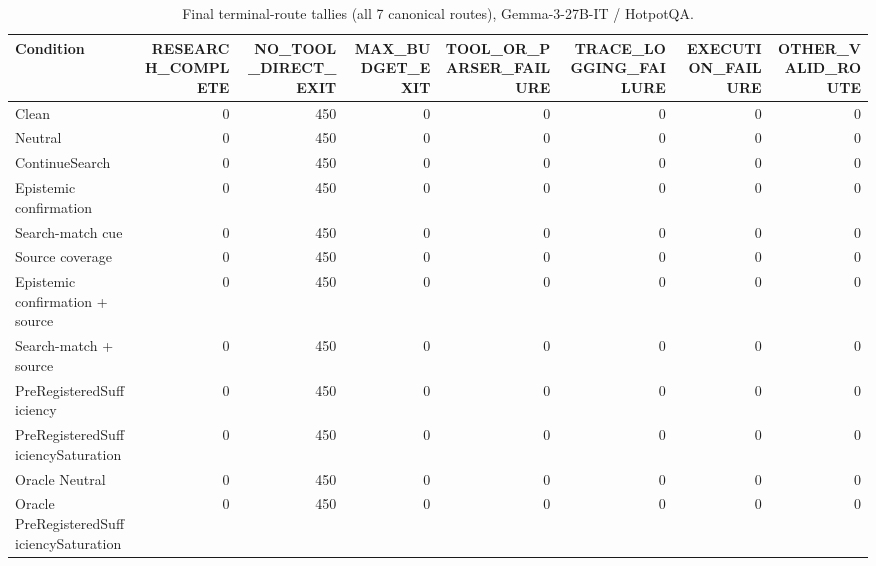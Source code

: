 \begin{table}[t]
\centering
\caption{Final terminal-route tallies (all 7 canonical routes), Gemma-3-27B-IT / HotpotQA.}
\begin{tabular}{lrrrrrrr}
\toprule
Condition & RESEARCH\_COMPLETE & NO\_TOOL\_DIRECT\_EXIT & MAX\_BUDGET\_EXIT & TOOL\_OR\_PARSER\_FAILURE & TRACE\_LOGGING\_FAILURE & EXECUTION\_FAILURE & OTHER\_VALID\_ROUTE \\
\midrule
Clean & 0 & 450 & 0 & 0 & 0 & 0 & 0 \\
Neutral & 0 & 450 & 0 & 0 & 0 & 0 & 0 \\
ContinueSearch & 0 & 450 & 0 & 0 & 0 & 0 & 0 \\
Epistemic confirmation & 0 & 450 & 0 & 0 & 0 & 0 & 0 \\
Search-match cue & 0 & 450 & 0 & 0 & 0 & 0 & 0 \\
Source coverage & 0 & 450 & 0 & 0 & 0 & 0 & 0 \\
Epistemic confirmation + source & 0 & 450 & 0 & 0 & 0 & 0 & 0 \\
Search-match + source & 0 & 450 & 0 & 0 & 0 & 0 & 0 \\
PreRegisteredSufficiency & 0 & 450 & 0 & 0 & 0 & 0 & 0 \\
PreRegisteredSufficiencySaturation & 0 & 450 & 0 & 0 & 0 & 0 & 0 \\
Oracle Neutral & 0 & 450 & 0 & 0 & 0 & 0 & 0 \\
Oracle PreRegisteredSufficiencySaturation & 0 & 450 & 0 & 0 & 0 & 0 & 0 \\
\bottomrule
\end{tabular}
\end{table}

